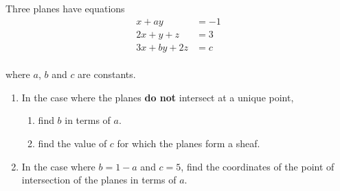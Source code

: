 \documentclass[leqno]{article}
\begin{document}
\begin{enumerate}[
  label=\textbf{\arabic*.},
  leftmargin=*,
  topsep=0pt,
  partopsep=0pt,
  parsep=0pt
]
\newpage

\questionitem

Three planes have equations
\[
\begin{aligned}
x+ay&=-1\\
2x+y+z&=3\\
3x+by+2z&=c
\end{aligned}
\] \\
where $a$, $b$ and $c$ are constants. \\
\begin{enumerate}[label=\textbf{(\alph*)}]
  \item In the case where the planes \textbf{do not} intersect at a unique point,
  \begin{enumerate}[label=(\roman*)]
    \item find $b$ in terms of $a$. 
    \item find the value of $c$ for which the planes form a sheaf.  \\
  \end{enumerate}
  \item In the case where $b=1-a$ and $c=5$, find the coordinates of the point of intersection of the planes in terms of $a$.  \\
\end{enumerate}

\newpage

\questionitem


\end{enumerate}
\end{document}

